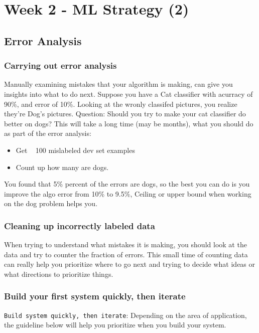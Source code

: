 \section{Week 2 - ML Strategy (2)}
\subsection{Error Analysis}

\subsubsection{Carrying out error analysis}
Manually examining mistakes that your algorithm is making, can give you insights into what to do next.
\newline
Suppose you have a Cat classifier with acurracy of 90\%, and error of 10\%. Looking at the wronly classifed pictures, you realize they're Dog's pictures.
\newline
Question: Should you try to make your cat classifier do better on dogs?
\newline
This will take a long time (may be months), what you should do as part of the error analysis:
\begin{itemize}
    \item Get ~ 100 mislabeled dev set examples
    \item Count up how many are dogs.
\end{itemize}
You found that 5\% percent of the errors are dogs, so the best you can do is you improve the algo error from 10\% to 9.5\%, Ceiling or upper bound when working on the dog problem helps you.

\subsubsection{Cleaning up incorrectly labeled data}
When trying to understand what mistakes it is making, you should look at the data and try to counter the fraction of errors. This small time of counting data can really help you prioritize where to go next and trying to decide what ideas or what directions to prioritize things.

\subsubsection{Build your first system quickly, then iterate}
\texttt{Build system quickly, then iterate}: Depending on the area of application, the guideline below will help you prioritize when you build your system.

